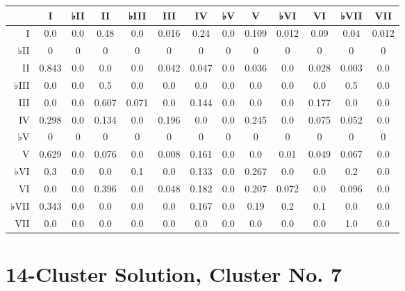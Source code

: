 \begin{table}[htbp]
\begin{minipage}{\linewidth}
\setlength{\tymax}{0.5\linewidth}
\centering
\small
\begin{tabulary}{\textwidth}{@{}RCCCCCCCCCCCC@{}} \toprule
&I&♭II&II&♭III&III&IV&♭V&V&♭VI&VI&♭VII&VII\\
\midrule
I&0.0&0.0&0.48&0.0&0.016&0.24&0.0&0.109&0.012&0.09&0.04&0.012\\
♭II&0&0&0&0&0&0&0&0&0&0&0&0\\
II&0.843&0.0&0.0&0.0&0.042&0.047&0.0&0.036&0.0&0.028&0.003&0.0\\
♭III&0.0&0.0&0.5&0.0&0.0&0.0&0.0&0.0&0.0&0.0&0.5&0.0\\
III&0.0&0.0&0.607&0.071&0.0&0.144&0.0&0.0&0.0&0.177&0.0&0.0\\
IV&0.298&0.0&0.134&0.0&0.196&0.0&0.0&0.245&0.0&0.075&0.052&0.0\\
♭V&0&0&0&0&0&0&0&0&0&0&0&0\\
V&0.629&0.0&0.076&0.0&0.008&0.161&0.0&0.0&0.01&0.049&0.067&0.0\\
♭VI&0.3&0.0&0.0&0.1&0.0&0.133&0.0&0.267&0.0&0.0&0.2&0.0\\
VI&0.0&0.0&0.396&0.0&0.048&0.182&0.0&0.207&0.072&0.0&0.096&0.0\\
♭VII&0.343&0.0&0.0&0.0&0.0&0.167&0.0&0.19&0.2&0.1&0.0&0.0\\
VII&0.0&0.0&0.0&0.0&0.0&0.0&0.0&0.0&0.0&0.0&1.0&0.0\\

\bottomrule

\end{tabulary}
\end{minipage}
\end{table}

\section{14-Cluster Solution, Cluster No. 7}
\label{14-clustersolutionclusterno.7}

